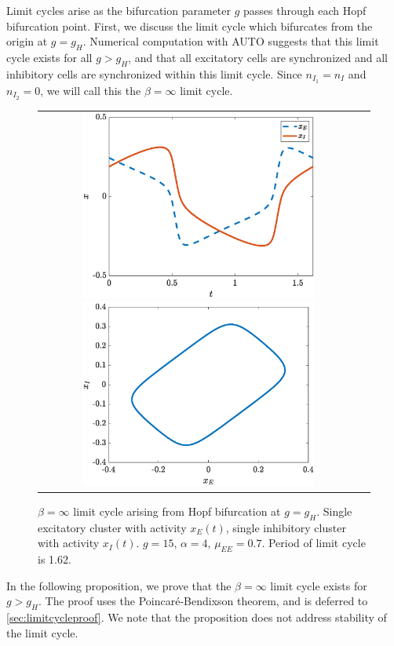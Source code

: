\documentclass[reqno]{siamonline190516}
\begin{document}
Limit cycles arise as the bifurcation parameter $g$ passes through each Hopf bifurcation point. First, we discuss the limit cycle which bifurcates from the origin at $g = g_H$. Numerical computation with AUTO \cite{AUTO} suggests that this limit cycle exists for all $g > g_H$, and that all excitatory cells are synchronized and all inhibitory cells are synchronized within this limit cycle. Since $n_{I_1} = n_I$ and $n_{I_2} = 0$, we will call this the $\beta=\infty$ limit cycle. 
\begin{figure}
    \centering
    \begin{tabular}{cc}
    \includegraphics[width=7.85cm]{images/limitcycle1.eps}
    \includegraphics[width=7.85cm]{images/limitcycle2.eps}
    \end{tabular}
    \caption{$\beta = \infty$ limit cycle arising from Hopf bifurcation at $g = g_H$. Single excitatory cluster with activity $x_E(t)$, single inhibitory cluster with activity $x_I(t)$. $g = 15$, $\alpha = 4$, $\mu_{EE}= 0.7$. Period of limit cycle is 1.62.} 
    \label{fig:limitcycleorigin}
\end{figure}

In the following proposition, we prove that the $\beta=\infty$ limit cycle exists for $g > g_H$. The proof uses the Poincar\'e-Bendixson theorem, and is deferred to \cref{sec:limitcycleproof}. We note that the proposition does not address stability of the limit cycle.
\end{document}
